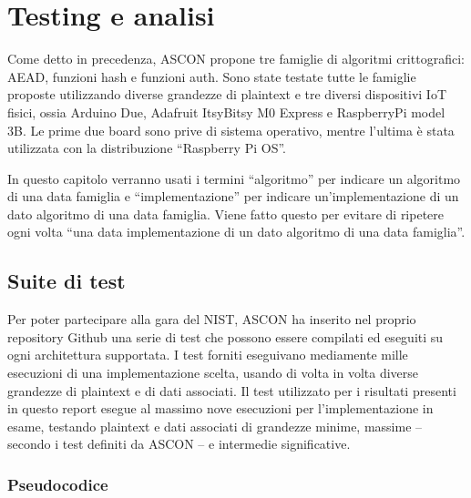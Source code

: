 \chapter{Testing e analisi}\label{ch:test_analysis}

Come detto in precedenza, ASCON propone tre famiglie di algoritmi crittografici: AEAD, funzioni hash e funzioni auth. Sono state testate tutte le famiglie proposte utilizzando diverse grandezze di plaintext e tre diversi dispositivi IoT fisici, ossia Arduino Due, Adafruit ItsyBitsy M0 Express e RaspberryPi model 3B. Le prime due board sono prive di sistema operativo, mentre l'ultima è stata utilizzata con la distribuzione ``Raspberry Pi OS''. \

\noindent In questo capitolo verranno usati i termini ``algoritmo'' per indicare un algoritmo di una data famiglia e ``implementazione'' per indicare un'implementazione di un dato algoritmo di una data famiglia. Viene fatto questo per evitare di ripetere ogni volta ``una data implementazione di un dato algoritmo di una data famiglia''.

\section{Suite di test}

Per poter partecipare alla gara del NIST, ASCON ha inserito nel proprio repository Github una serie di test che possono essere compilati ed eseguiti su ogni architettura supportata. I test forniti eseguivano mediamente mille esecuzioni di una implementazione scelta, usando di volta in volta diverse grandezze di plaintext e di dati associati. Il test utilizzato per i risultati presenti in questo report esegue al massimo nove esecuzioni per l'implementazione in esame, testando plaintext e dati associati di grandezze minime, massime – secondo i test definiti da ASCON – e intermedie significative.

\subsection{Pseudocodice}

